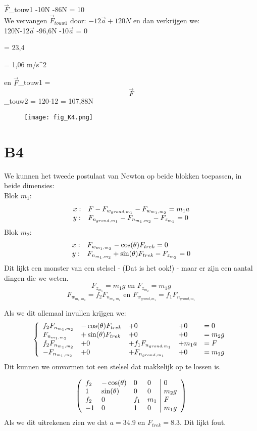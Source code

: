 \documentclass[10pt,a4paper]{article}
\begin{document}
$\vec{F}$_{touw1} -10N -86N = 10\\

We vervangen $\vec{F}_{touw1}$  door:  $-12\vec{a} + 120N$  en dan verkrijgen we:\\

120N-12$\vec{a}$ -96,6N -10$\vec{a}$ = 0

 = 23,4

\Rightarrow {} = 1,06 m/s^{2}

en $\vec{F}$_{touw1} = $$\vec{F}$$_{touw2} = 120-12 = 107,88N\\


\begin{wrapfigure}
	\centering
	\texttt{[image: fig\_K4.png]}
\end{wrapfigure}


\section*{B4}
We kunnen het tweede postulaat van Newton op beide blokken toepassen, in beide dimensies:\\
Blok $m_1$:
\[
\begin{array}{l l}
x: & F- F_{w_{grond,m_1}} -F_{w_{m_1,m_2}}=m_1a\\
y: & F_{n_{grond,m_1}}-F_{n_{m_1,m_2}}-F_{z_{m_1}}=0\\
\end{array}
\]
Blok $m_2$:
\[
\begin{array}{l l}
x: & F_{w_{m_1,m_2}} - \cos(\theta)F_{trek} = 0\\
y: & F_{n_{m_1,m_2}} + \sin(\theta)F_{trek} - F_{z_{m_2}}=0\\
\end{array}
\]
Dit lijkt een monster van een stelsel - (Dat is het ook!) - maar er zijn een aantal dingen die we weten.
\[
F_{z_{m_1}} = m_1g \text{ en } F_{z_{m_2}} = m_1g
\]
\[
F_{w_{m_1,m_2}} = f_2F_{n_{m_1,m_2}} \text{ en } F_{w_{grond,m_1}} = f_1F_{n_{grond,m_1}}
\]

Als we dit allemaal invullen krijgen we:
\[
\left\lbrace
\begin{array}{l l l l l}

f_2F_{n_{m_1,m_2}} &- \cos(\theta)F_{trek} &+ 0 &+ 0 &= 0\\
F_{n_{m_1,m_2}} &+ \sin(\theta)F_{trek} &+ 0 &+ 0 &= m_2g\\
 f_2F_{n_{m_1,m_2}} &+ 0 &+ f_1F_{n_{grond,m_1}} &+ m_1a &= F\\
-F_{n_{m_1,m_2}} &+ 0 &+F_{n_{grond,m_1}} &+ 0 &= m_1g\\
\end{array}
\right.
\]
Dit kunnen we omvormen tot een stelsel dat makkelijk op te lossen is.

\[
\left(
\begin{array}{l l l l | l}
f_2 & -\cos(\theta) & 0 & 0 & 0\\
1 &  \sin(\theta) & 0 & 0 & m_2g\\
f_2 & 0 & f_1 & m_1 & F\\
-1 & 0 & 1 & 0 & m_1g
\end{array}
\right)
\]
Als we dit uitrekenen zien we dat $a = 34.9$ en $F_{trek} = 8.3$. Dit lijkt fout.
\end{document}
